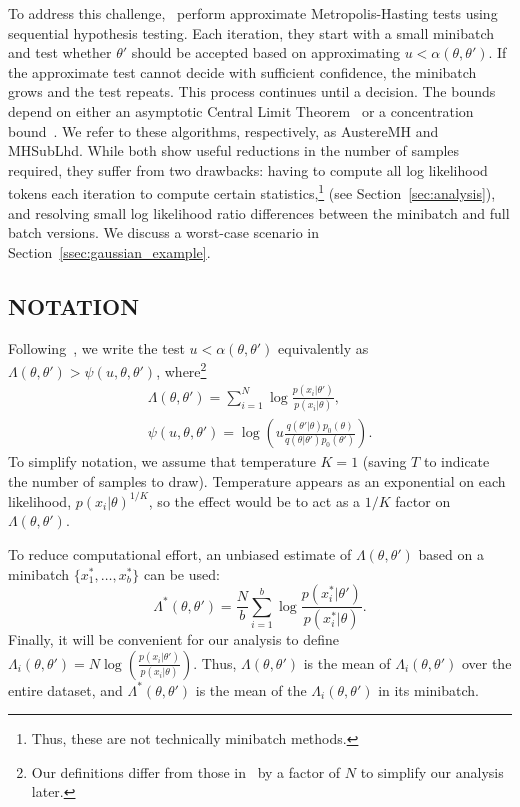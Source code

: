 \documentclass[letterpaper]{article}
\begin{document}
To address this challenge,~\citep{cutting_mh_2014,icml2014c1_bardenet14} perform
approximate Metropolis-Hasting tests using sequential hypothesis testing. Each
iteration, they start with a small minibatch and test whether $\theta'$ should
be accepted based on approximating $u<\alpha(\theta,\theta')$. If the
approximate test cannot decide with sufficient confidence, the minibatch grows
and the test repeats. This process continues until a decision. The bounds depend
on either an asymptotic Central Limit Theorem~\citep{cutting_mh_2014} or a
concentration bound~\citep{icml2014c1_bardenet14}. We refer to these algorithms,
respectively, as {\sc AustereMH} and {\sc MHSubLhd}. While both show useful
reductions in the number of samples required, they suffer from two drawbacks:
having to compute all log likelihood tokens each iteration to compute certain
statistics,\footnote{Thus, these are not technically minibatch methods.} (see
Section~\ref{sec:analysis}), and resolving small log likelihood ratio
differences between the minibatch and full batch versions. We discuss a
worst-case scenario in Section~\ref{ssec:gaussian_example}.


\subsection{NOTATION}\label{ssec:notation}

Following~\citep{icml2014c1_bardenet14}, we write the test
$u<\alpha(\theta,\theta')$ equivalently as $\Lambda(\theta,\theta') >
\psi(u,\theta,\theta')$, where\footnote{Our definitions differ from those
in~\citep{icml2014c1_bardenet14} by a factor of $N$ to simplify our analysis
later.}
\begin{equation}\label{eq:lambda}
\begin{split}
\Lambda(\theta,\theta') = \sum_{i=1}^N \log\frac{p(x_i|\theta')}{p(x_i|\theta)}, \\
\psi(u,\theta,\theta') = \log\left(u\frac{q(\theta'|\theta)p_0(\theta)}{q(\theta|\theta')p_0(\theta')}\right).
\end{split}
\end{equation}
To simplify notation, we assume that temperature $K=1$ (saving $T$ to indicate
the number of samples to draw). Temperature appears as an exponential on each
likelihood, $p(x_i|\theta)^{1/K}$, so the effect would be to act as a $1/K$
factor on $\Lambda(\theta,\theta')$.

To reduce computational effort, an unbiased estimate of $\Lambda(\theta,\theta')$
based on a minibatch $\{x_1^*,\ldots,x_b^*\}$ can be used:
\begin{equation}
\Lambda^*(\theta,\theta') = \frac{N}{b}\sum_{i=1}^b 
\log \frac{p(x_i^*|\theta')}{p(x_i^*|\theta)}.
\end{equation}
Finally, it will be convenient for our analysis to define
$\Lambda_i(\theta,\theta') = N\log(\frac{p(x_i|\theta')}{p(x_i|\theta)})$.
Thus, $\Lambda(\theta,\theta')$ is the mean of $\Lambda_i(\theta,\theta')$ over
the entire dataset, and $\Lambda^*(\theta,\theta')$ is the mean of
the $\Lambda_i(\theta,\theta')$ in its minibatch. 
\end{document}
